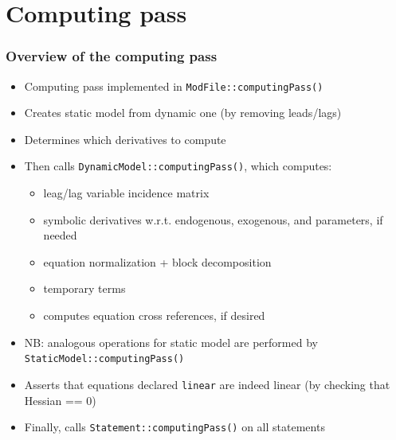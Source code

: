 \documentclass[aspectratio=169]{beamer}
\begin{document}
\section{Computing pass}

\begin{frame}
  \frametitle{Overview of the computing pass}
  \begin{itemize}
  \item Computing pass implemented in \texttt{ModFile::computingPass()}
  \item Creates static model from dynamic one (by removing leads/lags)
  \item Determines which derivatives to compute
  \item Then calls \texttt{DynamicModel::computingPass()}, which computes:
    \begin{itemize}
    \item leag/lag variable incidence matrix
    \item symbolic derivatives w.r.t. endogenous, exogenous, and parameters, if needed
    \item equation normalization + block decomposition
    \item temporary terms
    \item computes equation cross references, if desired
    \end{itemize}
  \item NB: analogous operations for static model are performed by \texttt{StaticModel::computingPass()}
  \item Asserts that equations declared \texttt{linear} are indeed linear (by checking that Hessian == 0)
  \item Finally, calls \texttt{Statement::computingPass()} on all statements
  \end{itemize}
\end{frame}
\end{document}
